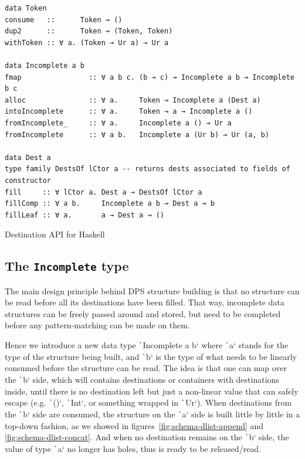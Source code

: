 \documentclass[english]{jflart}
\begin{document}
\begin{table}[t]
\small
\begin{verbatim}
data Token
consume   ::      Token ⊸ ()
dup2      ::      Token ⊸ (Token, Token)
withToken :: ∀ a. (Token ⊸ Ur a) ⊸ Ur a

data Incomplete a b
fmap                :: ∀ a b c. (b ⊸ c) ⊸ Incomplete a b ⊸ Incomplete b c
alloc               :: ∀ a.     Token ⊸ Incomplete a (Dest a)
intoIncomplete      :: ∀ a.     Token ⊸ a → Incomplete a ()
fromIncomplete_     :: ∀ a.     Incomplete a () ⊸ Ur a
fromIncomplete      :: ∀ a b.   Incomplete a (Ur b) ⊸ Ur (a, b)

data Dest a
type family DestsOf lCtor a -- returns dests associated to fields of constructor
fill     :: ∀ lCtor a. Dest a ⊸ DestsOf lCtor a
fillComp :: ∀ a b.     Incomplete a b ⊸ Dest a ⊸ b
fillLeaf :: ∀ a.       a → Dest a ⊸ ()
\end{verbatim}
\caption{Destination API for Haskell}
\label{table:destination-api}
\end{table}

\subsection{The \texttt{Incomplete} type}

The main design principle behind DPS structure building is that no structure can be read before all its destinations have been filled. That way, incomplete data structures can be freely passed around and stored, but need to be completed before any pattern-matching can be made on them.

Hence we introduce a new data type \texttt`Incomplete a b` where \texttt`a` stands for the type of the structure being built, and \texttt`b` is the type of what needs to be linearly consumed before the structure can be read. The idea is that one can map over the \texttt`b` side, which will contains destinations or containers with destinations inside, until there is no destination left but just a non-linear value that can safely escape (e.g. \texttt`()`, \texttt`Int`, or something wrapped in \texttt`Ur`). When destinations from the \texttt`b` side are consumed, the structure on the \texttt`a` side is built little by little in a top-down fashion, as we showed in figures~\ref{fig:schema-dlist-append} and \ref{fig:schema-dlist-concat}. And when no destination remains on the \texttt`b` side, the value of type \texttt`a` no longer has holes, thus is ready to be released/read.
\end{document}
